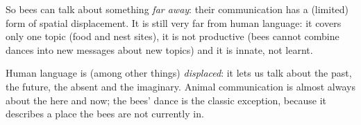 So bees can talk about something \emph{far away}: their communication has a (limited)
form of spatial displacement. It is still very far from human language: it covers only
one topic (food and nest sites), it is not productive (bees cannot combine dances into
new messages about new topics) and it is innate, not learnt.

\begin{nbintuition}
Human language is (among other things) \emph{displaced}: it lets us talk about the
past, the future, the absent and the imaginary. Animal communication is almost always
about the here and now; the bees' dance is the classic exception, because it describes
a place the bees are not currently in.
\end{nbintuition}
